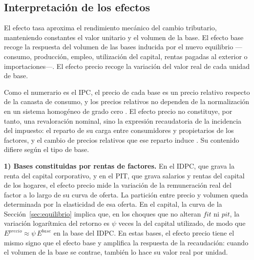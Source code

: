 \documentclass[11pt]{article}
\begin{document}
\subsection{Interpretación de los efectos}
\label{sec:interpretacion}

El efecto tasa aproxima el rendimiento mecánico del cambio tributario, manteniendo constantes el valor unitario y el volumen de la base. El efecto base recoge la respuesta del volumen de las bases inducida por el nuevo equilibrio ---consumo, producción, empleo, utilización del capital, rentas pagadas al exterior o importaciones---. El efecto precio recoge la variación del valor real de cada unidad de base.

Como el numerario es el IPC, el precio de cada base es un precio relativo respecto de la canasta de consumo, y los precios relativos no dependen de la normalización en un sistema homogéneo de grado cero \cite{shoven_whalley_1992,dewatripont_michel_1987}. El efecto precio no constituye, por tanto, una revaloración nominal, sino la expresión recaudatoria de la incidencia del impuesto: el reparto de su carga entre consumidores y propietarios de los factores, y el cambio de precios relativos que ese reparto induce \cite{harberger_1962,fullerton_metcalf_2002}. Su contenido difiere según el tipo de base.

\textbf{1) Bases constituidas por rentas de factores.} En el IDPC, que grava la renta del capital corporativo, y en el PIT, que grava salarios y rentas del capital de los hogares, el efecto precio mide la variación de la remuneración real del factor a lo largo de su curva de oferta. La partición entre precio y volumen queda determinada por la elasticidad de esa oferta. En el capital, la curva de la Sección~\ref{sec:equilibrio} implica que, en los choques que no alteran $fit$ ni $pit$, la variación logarítmica del retorno es $\psi$ veces la del capital utilizado, de modo que $E^{precio}\approx\psi\,E^{base}$ en la base del IDPC. En estas bases, el efecto precio tiene el mismo signo que el efecto base y amplifica la respuesta de la recaudación: cuando el volumen de la base se contrae, también lo hace su valor real por unidad.
\end{document}
